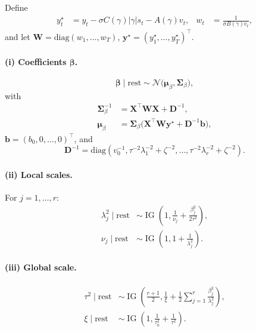 \documentclass[11pt]{article}
\newcommand{\N}{\mathcal{N}}
\newcommand{\diag}{\mathrm{diag}}
\newcommand{\vect}[1]{\bm{#1}}
\newcommand{\mat}[1]{\bm{#1}}
\DeclareMathOperator{\IG}{IG}
\begin{document}
Define
\begin{align}
  y_t^\star &= y_t - \sigma C(\gamma)|\gamma|s_t - A(\gamma)v_t,
  &
  w_t &= \frac{1}{\sigma B(\gamma)v_t},
\end{align}
and let $\mat{W}=\diag(w_1,\dots,w_T)$,
$\vect{y}^\star=(y_1^\star,\dots,y_T^\star)^\top$.

\paragraph{(i) Coefficients $\vect{\beta}$.}
\begin{equation}
  \vect{\beta}\mid\text{rest}
  \sim
  \N\!\big(\vect{\mu}_\beta,\mat{\Sigma}_\beta\big),
\end{equation}
with
\begin{align}
  \mat{\Sigma}_\beta^{-1}
  &= \mat{X}^\top\mat{W}\mat{X} + \mat{D}^{-1},
  \\
  \vect{\mu}_\beta
  &= \mat{\Sigma}_\beta\Big(\mat{X}^\top\mat{W}\vect{y}^\star + \mat{D}^{-1}\vect{b}\Big),
\end{align}
$\vect{b}=(b_0,0,\dots,0)^\top$, and
\begin{equation}
  \mat{D}^{-1}
  =
  \diag\!\left(
  v_0^{-1},
  \tau^{-2}\lambda_1^{-2}+\zeta^{-2},\dots,
  \tau^{-2}\lambda_r^{-2}+\zeta^{-2}
  \right).
\end{equation}

\paragraph{(ii) Local scales.}
For $j=1,\dots,r$:
\begin{align}
  \lambda_j^2\mid\text{rest}
  &\sim
  \IG\!\left(
    1,
    \frac{1}{\nu_j} + \frac{\beta_j^2}{2\tau^2}
  \right),
  \label{eq:fc-lambda2}
  \\
  \nu_j\mid\text{rest}
  &\sim
  \IG\!\left(
    1,
    1 + \frac{1}{\lambda_j^2}
  \right).
  \label{eq:fc-nu}
\end{align}

\paragraph{(iii) Global scale.}
\begin{align}
  \tau^2\mid\text{rest}
  &\sim
  \IG\!\left(
    \frac{r+1}{2},
    \frac{1}{\xi} + \frac12\sum_{j=1}^r \frac{\beta_j^2}{\lambda_j^2}
  \right),
  \label{eq:fc-tau2}
  \\
  \xi\mid\text{rest}
  &\sim
  \IG\!\left(
    1,
    \frac{1}{\tau_0^2} + \frac{1}{\tau^2}
  \right).
  \label{eq:fc-xi}
\end{align}
\end{document}
